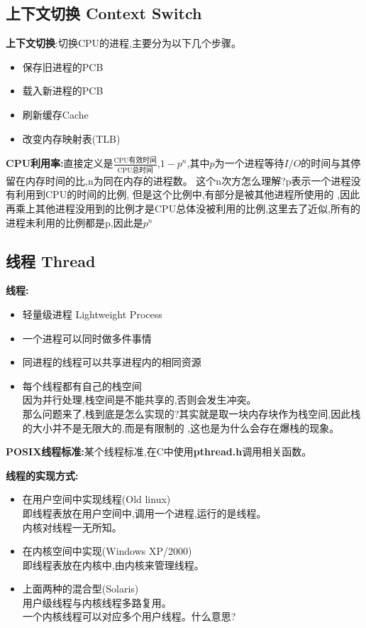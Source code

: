 \documentclass[UTF8,a4paper]{ctexart}
\newcommand{\spaceline}{\vspace{\baselineskip}}
\begin{document}
    \subsection{上下文切换 Context Switch}
    \textbf{上下文切换}:切换CPU的进程,主要分为以下几个步骤。
    \begin{itemize}
      \item 保存旧进程的PCB
      \item 载入新进程的PCB
      \item 刷新缓存Cache
      \item 改变内存映射表(TLB)
    \end{itemize}

    \textbf{CPU利用率:}直接定义是$\frac{\text{CPU有效时间}}{\text{CPU总时间}}$,$1 - p^n$,其中$p$为一个进程等待$I/O$的时间与其停留在内存时间的比,n为同在内存的进程数。
    {\color{blue}这个n次方怎么理解?p表示一个进程没有利用到CPU的时间的比例, 但是这个比例中,有部分是被其他进程所使用的
    ,因此再乘上其他进程没用到的比例才是CPU总体没被利用的比例,这里去了近似,所有的进程未利用的比例都是p,因此是$p^n$}

    \subsection{线程 Thread}
    \textbf{线程:}
    \begin{itemize}
      \item 轻量级进程 Lightweight Process
      \item 一个进程可以同时做多件事情
      \item 同进程的线程可以共享进程内的相同资源
      \item 每个线程都有自己的栈空间\\
      因为并行处理,栈空间是不能共享的,否则会发生冲突。\\
      {\color{blue}那么问题来了,栈到底是怎么实现的?其实就是取一块内存块作为栈空间,因此栈的大小并不是无限大的,而是有限制的
      ,这也是为什么会存在爆栈的现象。
      }
    \end{itemize}

    \textbf{POSIX线程标准:}某个线程标准,在C中使用\textbf{pthread.h}调用相关函数。

    \spaceline
    \textbf{线程的实现方式:}
    \begin{itemize}
      \item 在用户空间中实现线程(Old linux)\\
      即线程表放在用户空间中,调用一个进程,运行的是线程。\\
      内核对线程一无所知。
      \item 在内核空间中实现(Windows XP/2000)\\
      即线程表放在内核中,由内核来管理线程。
      \item 上面两种的混合型(Solaris)\\
      用户级线程与内核线程多路复用。\\
      一个内核线程可以对应多个用户线程。{\color{red}什么意思?}
    \end{itemize}
\end{document}
